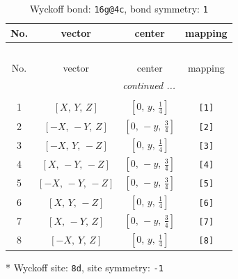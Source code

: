 \documentclass[fleqn,8pt]{jsarticle}
\begin{document}
\renewcommand{\arraystretch}{1.2}
\begin{longtable}{cccc}
\caption{Wyckoff bond: {\tt 16g@4c}, bond symmetry: {\tt 1}}
 \\
 \hline \hline
No. & vector & center & mapping \\ \hline \endfirsthead

\multicolumn{3}{l}{\tablename\ \thetable{}} \\
 \hline \hline
No. & vector & center & mapping \\ \hline \endhead

 \hline \hline
\multicolumn{3}{r}{\footnotesize\it continued ...} \\ \endfoot

 \hline \hline
\multicolumn{3}{r}{} \\ \endlastfoot

1 & $\left[ X,\, Y,\, Z \right]$ & $\left[ 0,\, y,\, \frac{1}{4} \right]$ & {\tt [1]} \\ \hline
2 & $\left[ - X,\, - Y,\, Z \right]$ & $\left[ 0,\, - y,\, \frac{3}{4} \right]$ & {\tt [2]} \\ \hline
3 & $\left[ - X,\, Y,\, - Z \right]$ & $\left[ 0,\, y,\, \frac{1}{4} \right]$ & {\tt [3]} \\ \hline
4 & $\left[ X,\, - Y,\, - Z \right]$ & $\left[ 0,\, - y,\, \frac{3}{4} \right]$ & {\tt [4]} \\ \hline
5 & $\left[ - X,\, - Y,\, - Z \right]$ & $\left[ 0,\, - y,\, \frac{3}{4} \right]$ & {\tt [5]} \\ \hline
6 & $\left[ X,\, Y,\, - Z \right]$ & $\left[ 0,\, y,\, \frac{1}{4} \right]$ & {\tt [6]} \\ \hline
7 & $\left[ X,\, - Y,\, Z \right]$ & $\left[ 0,\, - y,\, \frac{3}{4} \right]$ & {\tt [7]} \\ \hline
8 & $\left[ - X,\, Y,\, Z \right]$ & $\left[ 0,\, y,\, \frac{1}{4} \right]$ & {\tt [8]} \\
\end{longtable}
* Wyckoff site: {\tt 8d}, site symmetry: {\tt -1}
\renewcommand{\arraystretch}{1.2}
\end{document}
